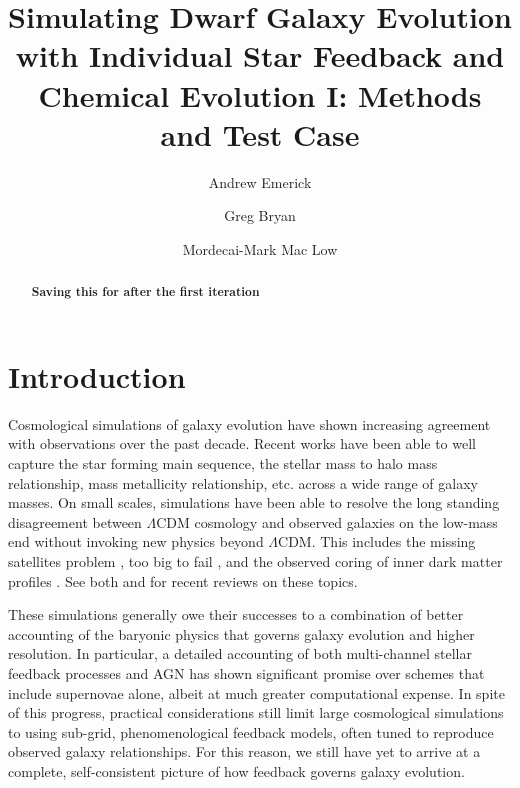 \documentclass[twocolumn]{aastex61}
\begin{document}
\title{Simulating Dwarf Galaxy Evolution with Individual Star Feedback and Chemical Evolution I: Methods and Test Case}
\author{Andrew Emerick}
\author{Greg Bryan}
\author{Mordecai-Mark Mac Low}


\begin{abstract}
\textbf{Saving this for after the first iteration}
\end{abstract}


\section{Introduction}

Cosmological simulations of galaxy evolution have shown increasing agreement with observations over the past decade. Recent works have been able to well capture the star forming main sequence, the stellar mass to halo mass relationship, mass metallicity relationship, etc. \citep[e.g.][]{EAGLE,Illustris1,Illustris2,FIRE,Dave2017} across a wide range of galaxy masses. On small scales, simulations have been able to resolve the long standing disagreement between $\Lambda$CDM cosmology and observed galaxies on the low-mass end without invoking new physics beyond $\Lambda$CDM. This includes the missing satellites problem \citep{Moore1999,Klypin1999}, too big to fail \citep{MBK2011,MBK2012,GK2014}, and the observed coring of inner dark matter profiles \citep[e.g.][]{Oh2011}. See both \cite{SomervilleDave2015} and \cite{NaabOstriker2016} for recent reviews on these topics. 

These simulations generally owe their successes to a combination of better accounting of the baryonic physics that governs galaxy evolution and higher resolution. In particular, a detailed accounting of both multi-channel stellar feedback processes and AGN has shown significant promise over schemes that include supernovae alone, albeit at much greater computational expense. In spite of this progress, practical considerations still limit large cosmological simulations to using sub-grid, phenomenological feedback models, often tuned to reproduce observed galaxy relationships. For this reason, we still have yet to arrive at a complete, self-consistent picture of how feedback governs galaxy evolution.
\end{document}

